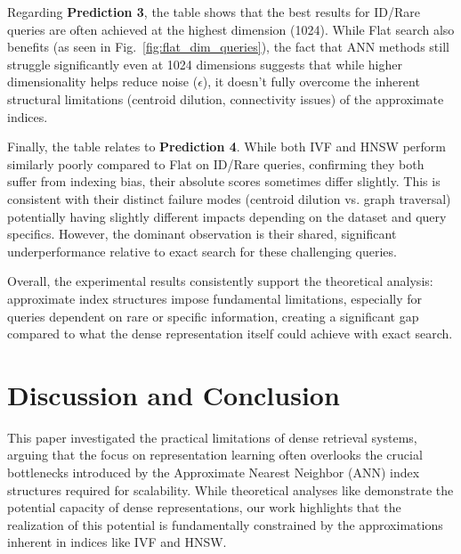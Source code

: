 \documentclass[manuscript]{acmart}
\begin{document}
Regarding \textbf{Prediction 3}, the table shows that the best results for ID/Rare queries are often achieved at the highest dimension (1024). While Flat search also benefits (as seen in Fig.~\ref{fig:flat_dim_queries}), the fact that ANN methods still struggle significantly even at 1024 dimensions suggests that while higher dimensionality helps reduce noise ($\epsilon$), it doesn't fully overcome the inherent structural limitations (centroid dilution, connectivity issues) of the approximate indices.

Finally, the table relates to \textbf{Prediction 4}. While both IVF and HNSW perform similarly poorly compared to Flat on ID/Rare queries, confirming they both suffer from indexing bias, their absolute scores sometimes differ slightly. This is consistent with their distinct failure modes (centroid dilution vs. graph traversal) potentially having slightly different impacts depending on the dataset and query specifics. However, the dominant observation is their shared, significant underperformance relative to exact search for these challenging queries.

Overall, the experimental results consistently support the theoretical analysis: approximate index structures impose fundamental limitations, especially for queries dependent on rare or specific information, creating a significant gap compared to what the dense representation itself could achieve with exact search.

\section{Discussion and Conclusion}

This paper investigated the practical limitations of dense retrieval systems, arguing that the focus on representation learning often overlooks the crucial bottlenecks introduced by the Approximate Nearest Neighbor (ANN) index structures required for scalability. While theoretical analyses like \citet{tay2020sparse} demonstrate the potential capacity of dense representations, our work highlights that the realization of this potential is fundamentally constrained by the approximations inherent in indices like IVF and HNSW.
\end{document}
